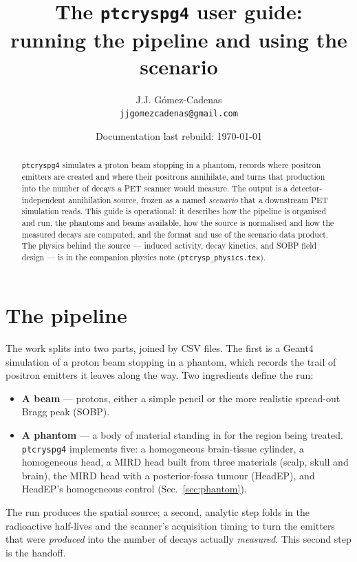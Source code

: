 \documentclass[11pt]{article}
\title{The \texttt{ptcryspg4} user guide:\\
running the pipeline and using the scenario}
\author{J.J. G\'omez-Cadenas\\\texttt{jjgomezcadenas@gmail.com}}
\date{Documentation last rebuild: \today}
\newcommand{\file}[1]{\texttt{#1}}
\begin{document}
\maketitle

\begin{abstract}
\texttt{ptcryspg4} simulates a proton beam stopping in a phantom, records where
positron emitters are created and where their positrons annihilate, and turns that
production into the number of decays a PET scanner would measure. The output is a
detector-independent annihilation source, frozen as a named \emph{scenario} that a
downstream PET simulation reads. This guide is operational: it describes how the
pipeline is organised and run, the phantoms and beams available, how the source is
normalised and how the measured decays are computed, and the format and use of the
scenario data product. The physics behind the source --- induced activity, decay
kinetics, and SOBP field design --- is in the companion physics note
(\file{ptcrysp\_physics.tex}).
\end{abstract}

\section{The pipeline}
\label{sec:pipeline}

The work splits into two parts, joined by CSV files. The first is a Geant4
simulation of a proton beam stopping in a phantom, which records the trail of
positron emitters it leaves along the way. Two ingredients define the run:
\begin{itemize}[nosep]
\item \textbf{A beam} --- protons, either a simple pencil or the more realistic
spread-out Bragg peak (SOBP).
\item \textbf{A phantom} --- a body of material standing in for the region being
treated. \texttt{ptcryspg4} implements five: a homogeneous brain-tissue cylinder,
a homogeneous head, a MIRD head built from three materials (scalp, skull and
brain), the MIRD head with a posterior-fossa tumour (HeadEP), and HeadEP's
homogeneous control (Sec.~\ref{sec:phantom}).
\end{itemize}

The run produces the spatial source; a second, analytic step folds in the
radioactive half-lives and the scanner's acquisition timing to turn the emitters
that were \emph{produced} into the number of decays actually \emph{measured}. This
second step is the handoff.
\end{document}
